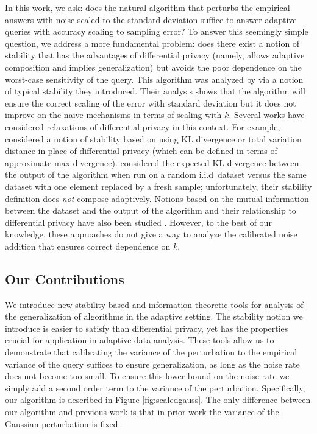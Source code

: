 \documentclass[final,12pt]{colt2018}
\begin{document}
In this work, we ask: does the natural algorithm that perturbs the empirical answers with noise scaled to the standard deviation suffice to answer adaptive queries with accuracy scaling to sampling error? To answer this seemingly simple question, we address a more fundamental problem: does there exist a notion of stability that has the advantages of differential privacy (namely, allows adaptive composition and implies generalization) but avoids the poor dependence on the worst-case sensitivity of the query. This algorithm was analyzed by \citet{BassilyFreund:16} via a notion of typical stability they introduced. Their analysis shows that the algorithm will ensure the correct scaling of the error with standard deviation but it does not improve on the naive mechanisms in terms of scaling with $k$.
Several works have considered relaxations of differential privacy in this context. For example, \citet{BassilyNSSSU16} considered a notion of stability based on using KL divergence or total variation distance in place of differential privacy (which can be defined in terms of approximate max divergence). \citet{Wang16} considered the expected KL divergence between the output of the algorithm when run on a random i.i.d~dataset versus the same dataset with one element replaced by a fresh sample; unfortunately, their stability definition does \emph{not} compose adaptively. Notions based on the mutual information between the dataset and the output of the algorithm and their relationship to differential privacy have also been studied \citep{DworkFHPRR15:arxiv,RussoZ16,RogersRST16,RaginskyRTWX16,XuR17}. However, to the best of our knowledge, these approaches do not give a way to analyze the calibrated noise addition that ensures correct dependence on $k$.

\subsection{Our Contributions}
We introduce new stability-based and information-theoretic tools for analysis of the generalization of algorithms in the adaptive setting. The stability notion we introduce is easier to satisfy than differential privacy, yet has the properties crucial for application in adaptive data analysis. These tools allow us to demonstrate that calibrating the variance of the perturbation to the empirical variance of the query suffices to ensure generalization, as long as the noise rate does not become too small. To ensure this lower bound on the noise rate we simply add a second order term to the variance of the perturbation.  Specifically, our algorithm is described in Figure \ref{fig:scaledgauss}. The only difference between our algorithm and previous work \citep{DworkFHPRR14:arxiv,BassilyNSSSU16} is that in prior work the variance of the Gaussian perturbation is fixed.%
\end{document}

